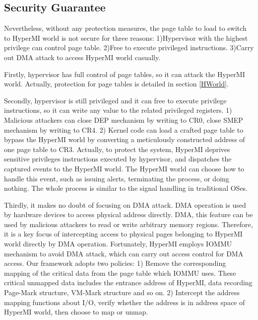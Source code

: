\documentclass[conference]{IEEEtran}
\begin{document}
\subsection{Security Guarantee}\label {SG}
Nevertheless, without any protection measures, the page table to load to switch to HyperMI world is not secure for three reasons: 1)Hypervisor with the highest privilege can control page table. 2)Free to execute privileged instructions. 3)Carry out DMA attack to access HyperMI world casually.

Firstly, hypervisor has full control of page tables, so it can attack the HyperMI world. Actually, protection for page tables is detailed in section \ref{HWorld}. 

Secondly, hypervisor is still privileged and it can free to execute privilege instructions, so it can write any value to the related privileged registers. 1) Malicious attackers can close DEP mechanism by writing to CR0, close SMEP mechanism by writing to CR4. 2) Kernel code can load a crafted page table to bypass the HyperMI world by converting a meticulously constructed address of one page table to CR3.
Actually, to protect the system, HyperMI deprives sensitive privileges instructions executed by hypervisor, and dispatches the captured events to the HyperMI world. The HyperMI world can choose how to handle this event, such as issuing alerts, terminating the process, or doing nothing. The whole process is similar to the signal handling in traditional OSes.

Thirdly, it makes no doubt of focusing on DMA attack. DMA operation is used by hardware devices to access physical address directly. 
DMA, this feature can be used by malicious attackers to read or write arbitrary memory regions. Therefore, it is a key focus of intercepting access to physical pages belonging to HyperMI world directly by DMA operation. 
Fortunately, HyperMI employs IOMMU mechanism to avoid DMA attack, which can carry out access control for DMA access. Our framework adopts two policies: 1) Remove the corresponding mapping of the critical data from the page table which IOMMU uses. These critical unmapped data includes the entrance address of HyperMI, data recording Page-Mark structure, VM-Mark structure and so on. 2) Intercept the address mapping functions about I/O, verify whether the address is in address space of HyperMI world, then choose to map or unmap.


\end{document}
